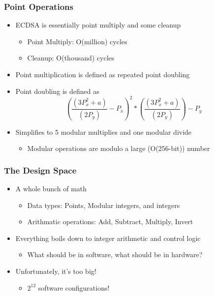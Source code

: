 \documentclass{beamer}
\begin{document}
\begin{frame}
  \frametitle{Point Operations}

  \begin{itemize}
  \item ECDSA is essentially point multiply and some cleanup
    \begin{itemize}
    \item Point Multiply: O(million) cycles
    \item Cleanup: O(thousand) cycles
    \end{itemize}
  \item Point multiplication is defined as repeated point doubling
  \item Point doubling is defined as
    $$ \left(\frac{(3 P_x^2 + a)}{(2 P_y)} - P_x \right)^2 * \left(\frac{(3 P_x^2 + a)}{(2 P_y)}\right) - P_y$$
  \item Simplifies to 5 modular multiplies and one modular divide
    \begin{itemize}
    \item Modular operations are modulo a large (O(256-bit)) number
    \end{itemize}
  \end{itemize}
\end{frame}

\begin{frame}[fragile]
  \frametitle{The Design Space}

  \begin{itemize}
  \item A whole bunch of math
    \begin{itemize}
    \item Data types: Points, Modular integers, and integers
    \item Arithmatic operations: Add, Subtract, Multiply, Invert
    \end{itemize}
  \item Everything boils down to integer arithmetic and control logic
    \begin{itemize}
    \item What should be in software, what should be in hardware?
    \end{itemize}
  \item Unfortunately, it's too big!
    \begin{itemize}
    \item $2^{12}$ software configurations!
    \end{itemize}
  \end{itemize}
\end{frame}
\end{document}
